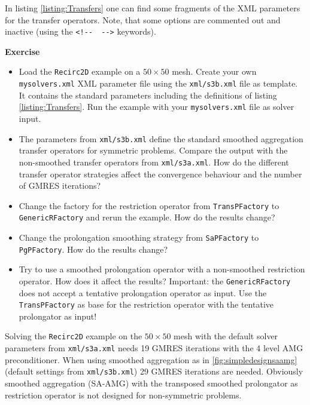\documentclass[12pt,a4paper]{article}
\begin{document}
In listing \ref{listing:Transfers} one can find some fragments of the XML parameters for the transfer operators. Note, that some options are commented out and inactive (using the \verb|<!--  -->| keywords).

\begin{graybox}
 \textbf{Exercise}
 \begin{itemize}
  \item Load the \verb|Recirc2D| example on a $50\times 50$ mesh. Create your own \verb|mysolvers.xml| XML parameter file using the \verb|xml/s3b.xml| file as template. It contains the standard parameters including the definitions of listing \ref{listing:Transfers}. Run the example with your \verb|mysolvers.xml| file as solver input.
  \item The parameters from \verb|xml/s3b.xml| define the standard smoothed aggregation transfer operators for symmetric problems. Compare the output with the non-smoothed transfer operators from \verb|xml/s3a.xml|. How do the different transfer operator strategies affect the convergence behaviour and the number of GMRES iterations?
  \item Change the factory for the restriction operator from \verb|TransPFactory| to \verb|GenericRFactory| and rerun the example. How do the results change?
  \item Change the prolongation smoothing strategy from \verb|SaPFactory| to \verb|PgPFactory|. How do the results change?
  \item Try to use a smoothed prolongation operator with a non-smoothed restriction operator. How does it affect the results? Important: the \verb|GenericRFactory| does not accept a tentative prolongation operator as input. Use the \verb|TransPFactory| as base for the restriction operator with the tentative prolongator as input!
 \end{itemize}
\end{graybox}

Solving the \texttt{Recirc2D} example on the $50\times 50$ mesh with the default solver parameters from \verb|xml/s3a.xml| needs 19 GMRES iterations with the 4 level AMG preconditioner. When using smoothed aggregation as in \ref{fig:simpledesignsaamg} (default settings from \verb|xml/s3b.xml|) 29 GMRES iterations are needed. Obviously smoothed aggregation (SA-AMG) with the transposed smoothed prolongator as restriction operator is not designed for non-symmetric problems.
\end{document}
